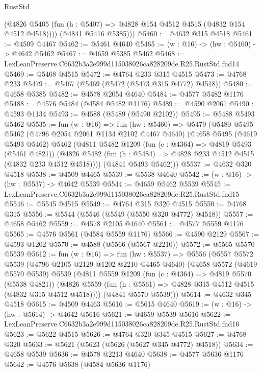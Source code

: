 \begin{lexlean}{RustStd}
\begin{coremodule}
          (@4826 @5405 (fun (h : @5407) => @4828 @154 @4512 @4515 (@4832 @154 @4512 @4518))))
        (@4841 @5416 @5385)))
@5460 := @4632 @315 @4518
@5461 := @4509 @4467
@5462 := @5461 @4640
@5465 := (w : @16) -> (hw : @5460) -> @4642 @5462
@5467 := @4659 @5385 @5462
@5468 := LexLeanPreserve.C6632b3a2e999d115038026ca828209de.R25.RustStd.fnd14
@5469 := @5468 @4515
@5472 := @4764 @233 @315 @4515
@5473 := @4768 @233
@5479 := @5467 (@5469 (@5472 (@5473 @315 @4772) @4518))
@5480 := @4658 @5385
@5482 := @4578 @2054 @4640
@5484 := @4577 @5482 @1176
@5488 := @4576 @5484 (@4584 @5482 @1176)
@5489 := @4590 @2061
@5490 := @4593 @1134
@5493 := @4588 (@5489 (@5490 @2102))
@5495 := @5488 @5493 @5462
@5535 := fun (w : @16) =>
  fun (hw : @5460) =>
  @5479
    (@5480
      @5495
      @5462
      (@4796 @2054 @2061 @1134 @2102 @4467 @4640)
      (@4658
        @5495
        (@4619 @5493 @5462)
        @5462
        (@4811
          @5482
          @1209
          (fun (c : @4364) => @4819 @5493 (@5461 @4821))
          (@4826 @5482 (fun (h : @5484) => @4828 @233 @4512 @4515 (@4832 @233 @4512 @4518))))
        (@4841 @5493 @5462)))
@5537 := @4632 @320 @4518
@5538 := @4509 @4465
@5539 := @5538 @4640
@5542 := (w : @16) -> (hw : @5537) -> @4642 @5539
@5544 := @4659 @5462 @5539
@5545 := LexLeanPreserve.C6632b3a2e999d115038026ca828209de.R25.RustStd.fnd15
@5546 := @5545 @4515
@5549 := @4764 @315 @320 @4515
@5550 := @4768 @315
@5556 := @5544 (@5546 (@5549 (@5550 @320 @4772) @4518))
@5557 := @4658 @5462
@5559 := @4578 @2105 @4640
@5561 := @4577 @5559 @1176
@5565 := @4576 @5561 (@4584 @5559 @1176)
@5566 := @4590 @2129
@5567 := @4593 @1202
@5570 := @4588 (@5566 (@5567 @2210))
@5572 := @5565 @5570 @5539
@5612 := fun (w : @16) =>
  fun (hw : @5537) =>
  @5556
    (@5557
      @5572
      @5539
      (@4796 @2105 @2129 @1202 @2210 @4465 @4640)
      (@4658
        @5572
        (@4619 @5570 @5539)
        @5539
        (@4811
          @5559
          @1209
          (fun (c : @4364) => @4819 @5570 (@5538 @4821))
          (@4826 @5559 (fun (h : @5561) => @4828 @315 @4512 @4515 (@4832 @315 @4512 @4518))))
        (@4841 @5570 @5539)))
@5614 := @4632 @345 @4518
@5615 := @4509 @4463
@5616 := @5615 @4640
@5619 := (w : @16) -> (hw : @5614) -> @4642 @5616
@5621 := @4659 @5539 @5616
@5622 := LexLeanPreserve.C6632b3a2e999d115038026ca828209de.R25.RustStd.fnd16
@5623 := @5622 @4515
@5626 := @4764 @320 @345 @4515
@5627 := @4768 @320
@5633 := @5621 (@5623 (@5626 (@5627 @345 @4772) @4518))
@5634 := @4658 @5539
@5636 := @4578 @2213 @4640
@5638 := @4577 @5636 @1176
@5642 := @4576 @5638 (@4584 @5636 @1176)

\end{coremodule}
\end{lexlean}
